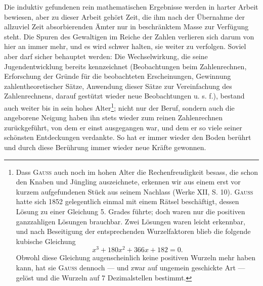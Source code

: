 Die induktiv gefundenen rein mathematischen Ergebnisse werden in harter
Arbeit bewiesen, aber zu dieser Arbeit gehört Zeit, die ihm nach der Übernahme der allzuviel Zeit absorbierenden Ämter nur in beschränktem Masse
zur Verfügung steht.
\clearpage{}
\setcounter{footnote}{0}
\noindent\hspace*{\parindent}Die Spuren des Gewaltigen im Reiche der Zahlen verlieren sich darum
von hier an immer mehr, und es wird schwer halten, sie weiter zu verfolgen.
Soviel aber darf sicher behauptet werden: Die Wechselwirkung, die seine
Jugendentwicklung bereits kennzeichnet (Beobachtungen beim Zahlenrechnen,
Erforschung der Gründe für die beobachteten Erscheinungen, Gewinnung
zahlentheoretischer Sätze, Anwendung dieser Sätze zur Vereinfachung des Zahlenrechnens, darauf gestützt wieder neue Beobachtungen u. s. f.), bestand auch
weiter bis in sein hohes Alter\footnote{Dass \textsc{Gauss} auch noch im hohen Alter die Rechenfreudigkeit besass, die schon den Knaben und
Jüngling auszeichnete, erkennen wir aus einem erst vor kurzem aufgefundenen Stück aus seinem Nachlass
(Werke XII, S. 10). \textsc{Gauss} hatte sich 1852 gelegentlich einmal mit einem Rätsel beschäftigt, dessen Lösung
zu einer Gleichung 5. Grades führte; doch waren nur die positiven ganzzahligen Lösungen brauchbar. Zwei
Lösungen waren leicht erkennbar, und nach Beseitigung der entsprechenden Wurzelfaktoren blieb die folgende kubische Gleichung
\[
x^3+180x^2+366x+182=0.
\]
\noindent Obwohl diese Gleichung augenscheinlich keine positiven Wurzeln mehr haben kann, hat sie \textsc{Gauss} dennoch — und zwar auf ungemein geschickte Art — gelöst und die Wurzeln auf 7 Dezimalstellen bestimmt.}; nicht nur der Beruf, sondern auch die angeborene Neigung haben ihn stets wieder zum reinen Zahlenrechnen zurückgeführt, von dem er einst ausgegangen war, und dem er so viele seiner schönsten
Entdeckungen verdankte. So hat er immer wieder den Boden berührt und
durch diese Berührung immer wieder neue Kräfte gewonnen.
\clearpage\endgroup

